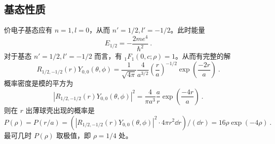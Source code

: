 \subsection{基态性质}
价电子基态应有 $n=1, l=0$，从而 $n' = 1/2, l'=-1/2$。此时能量
$$E_{1/2} = -\frac{2me^4}{\hbar^2}~.$$
对于基态 $n'=1/2, l'=-1/2$ 而言，有 $_1F_1(0, c; \rho) = 1$。从而有完整的解
\begin{equation}
R_{1/2,-1/2}(r) Y_{0,0}(\theta, \phi) = \frac{1}{\sqrt{4\pi}} \frac{4}{a^{3/2}} \left(\frac{r}{a}\right)^{-1/2} \exp\left(\frac{-2r}{a}\right) ~.
\end{equation}
概率密度是模的平方为
\begin{equation}
|R_{1/2, -1/2}(r) Y_{0, 0}(\theta, \phi)|^2 = \frac{4}{\pi a^3}\frac{a}{r}\exp\left(\frac{-4r}{a}\right)~.
\end{equation}
则在 $r$ 出薄球壳出现的概率是
\begin{equation}
P(\rho) = P(r/a) = (|R_{1/2, -1/2}(r) Y_{0, 0}(\theta, \phi)|^2 \cdot 4\pi r^2 \dd r)/(\dd r) = 16 \rho \exp(-4\rho)~.
\end{equation}
最可几时 $P(\rho)$ 取极值，即 $\rho=1/4$ 处。